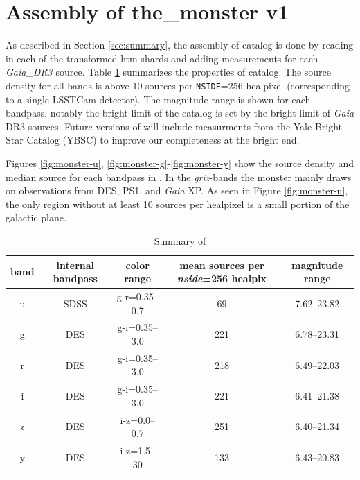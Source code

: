 \section{Assembly of the\_monster v1}
\label{sec:assembly}
As described in Section \ref{sec:summary}, the assembly of \monster catalog is done by reading in each of the transformed htm shards and adding measurements for each \textit{Gaia\_DR3} source.
Table \ref{tab:summary} summarizes the properties of \monster catalog.
The source density for all bands is above 10 sources per \texttt{NSIDE}=256 healpixel (corresponding to a single LSSTCam detector).
The magnitude range is shown for each bandpass, notably the bright limit of the catalog is set by the bright limit of \emph{Gaia} DR3 sources.
Future versions of \monster will include measurments from the Yale Bright Star Catalog (YBSC) to improve our completeness at the bright end.

Figures \ref{fig:monster-u}, \ref{fig:monster-g}-\ref{fig:monster-y} show the source density and median source for each bandpass in \monster.
In the \emph{griz}-bands the monster mainly draws on observations from DES, PS1, and \emph{Gaia} XP.
As seen in Figure \ref{fig:monster-u}, the only region without at least 10 sources per healpixel is a small portion of the galactic plane. 

\begin{table}[htbp]
    \centering
    \label{tab:summary}
    
    \begin{tabular}{|c | c | c | c | c |}
        \hline
        \textbf{band} & \textbf{internal bandpass} & \textbf{color range} & \textbf{mean sources per \emph{nside}=256 healpix} & \textbf{magnitude range} \\
        \hline
        u             &  SDSS                      & g-r=0.35--0.7        & 69                      & 7.62--23.82                   \\
        g             & DES                        & g-i=0.35--3.0        & 221                     & 6.78--23.31                 \\
        r             & DES                        & g-i=0.35--3.0        & 218                     & 6.49--22.03                   \\
        i             & DES                        & g-i=0.35--3.0        & 221                     & 6.41--21.38                    \\
        z             & DES                        & i-z=0.0--0.7         & 251                     & 6.40--21.34                   \\
        y             & DES                        & i-z=1.5--30          & 133                     & 6.43--20.83                    \\
        \hline
    \end{tabular}
    \caption{Summary of \monster}
\end{table}


